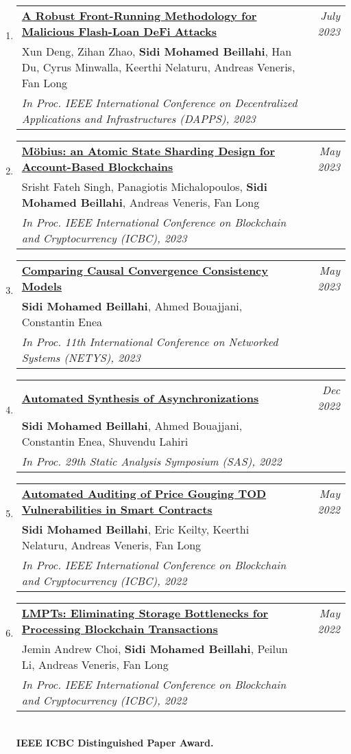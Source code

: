 \documentclass[10pt]{article}
\makeatletter
\newcommand{\lbar}[1]{{\color{#1}\ding{118}}\hspace*{2pt}}
\newenvironment{benumerate}[2]{
    \let\oldItem\item
    \def\item{\addtocounter{enumi}{-2}\oldItem}
    \begin{enumerate}[#2] \itemsep3pt
    \setcounter{enumi}{#1}
    \addtocounter{enumi}{1}}
  {\end{enumerate}}
\newenvironment{publication}[5]
{ \item
  \begin{tabular*}{7.5in}{p{6.3in}@{\extracolsep{\fill}}r}
    \href{#1}{\textbf{#2}} & \textit{#3}\\ #4 &\\ \textit{#5}&\\
  \end{tabular*}
} {}
\newenvironment{region}[3]{%
  \vspace*{0.5ex}
  {\scalebox{1.4}{\textbf{#1}}}
  \begin{benumerate}{#3}{\color{RoyalBlue}#2}}
  {\end{benumerate}\vspace{0.8ex}}
\makeatother
\begin{document}
\begin{region} {\lbar{black}Conference Publications}{{C}1}{18}
  \begin{publication} {https://beillahi.github.io/papers/DAPPS23.pdf}
		{A Robust Front-Running Methodology for Malicious Flash-Loan DeFi Attacks} 
		{July 2023} {Xun Deng, Zihan Zhao, \textbf{Sidi Mohamed Beillahi}, Han Du, Cyrus Minwalla, Keerthi Nelaturu, 
    Andreas Veneris, Fan Long}
		{In Proc. IEEE International Conference on Decentralized Applications and Infrastructures (DAPPS), 2023}
  \end{publication}
 
  \begin{publication} {https://beillahi.github.io/papers/ICBC23.pdf}
		{Möbius: an Atomic State Sharding Design for Account-Based Blockchains} 
		{May 2023} {Srisht Fateh Singh, Panagiotis Michalopoulos, \textbf{Sidi Mohamed Beillahi}, Andreas Veneris, Fan Long}
		{In Proc. IEEE International Conference on Blockchain and Cryptocurrency (ICBC), 2023}
  \end{publication}

  \begin{publication} {https://beillahi.github.io/papers/NETYS23.pdf}
		{Comparing Causal Convergence Consistency Models}
		{May 2023} {\textbf{Sidi Mohamed Beillahi}, Ahmed Bouajjani, Constantin Enea}
		{In Proc. 11th International Conference on Networked Systems (NETYS), 2023}
  \end{publication}

  \begin{publication} {https://beillahi.github.io/papers/SAS22.pdf}
		{Automated Synthesis of Asynchronizations}
		{Dec 2022} {\textbf{Sidi Mohamed Beillahi}, Ahmed Bouajjani, Constantin Enea, Shuvendu Lahiri}
		{In Proc. 29th Static Analysis Symposium (SAS), 2022}
  \end{publication}

  \begin{publication} {https://beillahi.github.io/papers/2022040426.pdf}
		{Automated Auditing of Price Gouging TOD Vulnerabilities in Smart Contracts}
		{May 2022} {\textbf{Sidi Mohamed Beillahi}, Eric Keilty, Keerthi Nelaturu, Andreas Veneris, Fan Long}
		{In Proc. IEEE International Conference on Blockchain and Cryptocurrency (ICBC), 2022}
  \end{publication}

  \begin{publication} {https://beillahi.github.io/papers/2022044041.pdf}
		{LMPTs: Eliminating Storage Bottlenecks for Processing Blockchain Transactions}
		{May 2022} {Jemin Andrew Choi, \textbf{Sidi Mohamed Beillahi}, Peilun Li, Andreas Veneris, Fan Long}
		{In Proc. IEEE International Conference on Blockchain and Cryptocurrency (ICBC), 2022}
    {\\ \textbf{IEEE ICBC Distinguished Paper Award.}}
  \end{publication}


\end{region}
\end{document}
